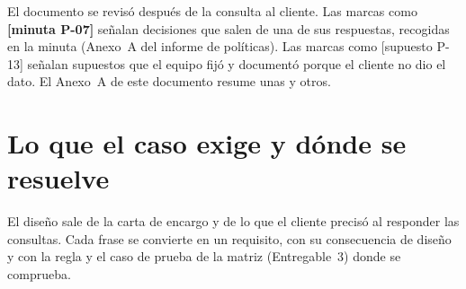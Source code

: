 \documentclass[11pt,letterpaper]{article}
\newcommand{\resp}[1]{\textrm{\footnotesize\bfseries [minuta #1]}}
\newcommand{\supu}[1]{\textrm{\footnotesize [supuesto #1]}}
\begin{document}
El documento se revisó después de la consulta al cliente. Las marcas como \resp{P-07} señalan
decisiones que salen de una de sus respuestas, recogidas en la minuta (Anexo~A del informe de
políticas). Las marcas como \supu{P-13} señalan supuestos que el equipo fijó y documentó porque el
cliente no dio el dato. El Anexo~A de este documento resume unas y otros.

\section{Lo que el caso exige y dónde se resuelve}
\label{sec:requisitos}

El diseño sale de la carta de encargo y de lo que el cliente precisó al responder las consultas. Cada
frase se convierte en un requisito, con su consecuencia de diseño y con la regla y el caso de prueba
de la matriz (Entregable~3) donde se comprueba.
\end{document}
